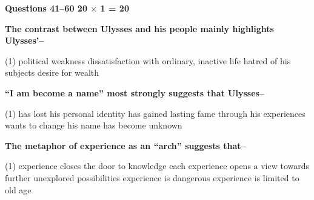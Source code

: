 \documentclass[12pt,a4paper]{exam}
\begin{document}
\newpage
\begin{center}
\end{center}

\textbf{Questions 41--60 \hfill 20 $\times$ 1 = 20}

\vspace{4pt}

\begin{questions}

	\setcounter{question}{40}


	\begin{minipage}{\textwidth}
		\question \textbf{The contrast between Ulysses and his people mainly highlights Ulysses'--}

		\begin{tasks}(1)
			\task political weakness
			\task dissatisfaction with ordinary, inactive life
			\task hatred of his subjects
			\task desire for wealth
		\end{tasks}
	\end{minipage}


	\begin{minipage}{\textwidth}
		\question \textbf{``I am become a name'' most strongly suggests that Ulysses--}

		\begin{tasks}(1)
			\task has lost his personal identity
			\task has gained lasting fame through his experiences
			\task wants to change his name
			\task has become unknown
		\end{tasks}
	\end{minipage}


	\begin{minipage}{\textwidth}
		\question \textbf{The metaphor of experience as an ``arch'' suggests that--}

		\begin{tasks}(1)
			\task experience closes the door to knowledge
			\task each experience opens a view towards further unexplored possibilities
			\task experience is dangerous
			\task experience is limited to old age
		\end{tasks}
	\end{minipage}


\end{questions}
\end{document}
